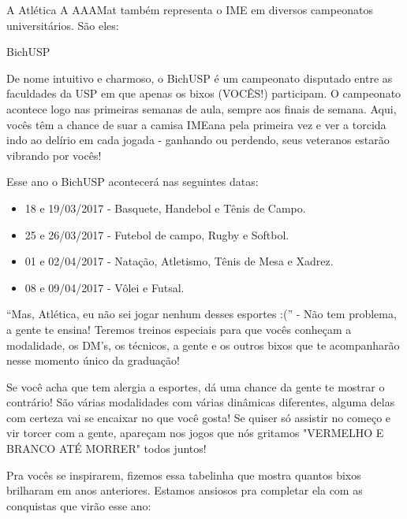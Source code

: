 \begin{secao}{A Atlética}
A AAAMat também representa o IME em diversos campeonatos universitários. São
eles:

\begin{subsecao}{BichUSP}

De nome intuitivo e charmoso, o BichUSP é um campeonato disputado entre as
faculdades da USP em que apenas os bixos (VOCÊS!) participam. O campeonato
acontece logo nas primeiras semanas de aula, sempre aos finais de semana. Aqui,
vocês têm a chance de suar a camisa IMEana pela primeira vez e ver a torcida
indo ao delírio em cada jogada - ganhando ou perdendo, seus veteranos estarão
vibrando por vocês!

Esse ano o BichUSP acontecerá nas seguintes datas:

\begin{itemize}
  \item 18 e 19/03/2017 - Basquete, Handebol e Tênis de Campo.
  \item 25 e 26/03/2017 - Futebol de campo, Rugby e Softbol.
  \item 01 e 02/04/2017 - Natação, Atletismo, Tênis de Mesa e Xadrez.
  \item 08 e 09/04/2017 - Vôlei e Futsal.
\end{itemize}

``Mas, Atlética, eu não sei jogar nenhum desses esportes :('' - Não tem
problema, a gente te ensina! Teremos treinos especiais para que vocês conheçam
a modalidade, os DM’s, os técnicos, a gente e os outros bixos que te
acompanharão nesse momento único da graduação!

Se você acha que tem alergia a esportes, dá uma chance da gente te mostrar o
contrário! São várias modalidades com várias dinâmicas diferentes, alguma delas
com certeza vai se encaixar no que você gosta! Se quiser só assistir no começo
e vir torcer com a gente, apareçam nos jogos que nós gritamos "VERMELHO E
BRANCO ATÉ MORRER" todos juntos!

Pra vocês se inspirarem, fizemos essa tabelinha que mostra quantos bixos
brilharam em anos anteriores. Estamos ansiosos pra completar ela com as
conquistas que virão esse ano:


\end{subsecao}
\end{secao}
